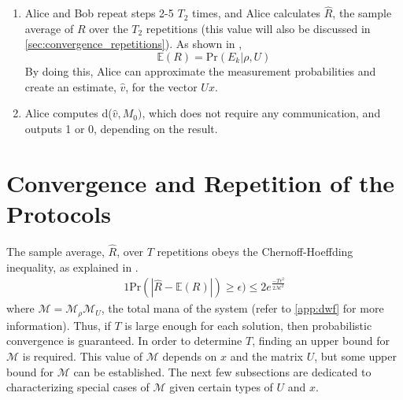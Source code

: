 \documentclass[../3Wworkreport.tex]{subfiles}
\begin{document}
\begin{enumerate}
	\item
		Alice and Bob repeat steps 2-5 $T_2$ times, and Alice calculates $\hat{R}$, the sample average of $R$ over the $T_2$ repetitions (this value will also be discussed in \autoref{sec:convergence_repetitions}). As shown in \cite{Pashayan2014},
		\begin{equation}
			\mathbb{E}(R) = \text{Pr}(E_k| \rho, U)
		\end{equation}
		By doing this, Alice can approximate the measurement probabilities and create an estimate, $\hat{v}$, for the vector $Ux$.

	\item
		Alice computes d($\hat{v}, M_0)$, which does not require any communication, and outputs 1 or 0, depending on the result. 
\end{enumerate}

\section{Convergence and Repetition of the Protocols}
\label{sec:convergence_repetitions}
The sample average, $\hat{R}$, over $T$ repetitions obeys the Chernoff-Hoeffding inequality, as explained in \cite{Pashayan2014}.
\begin{alignat}{1} \label{eq:chernoff}
	\text{Pr}(|\hat{R} - \mathbb{E}(R)|) \ge \epsilon) \le 2e^{\frac{-T\epsilon^2}{2\mathcal{M}^2}}
\end{alignat}
where $\mathcal{M} = \mathcal{M}_\rho\mathcal{M}_U$, the total mana of the system (refer to \autoref{app:dwf} for more information). Thus, if $T$ is large enough for each solution, then probabilistic convergence is guaranteed. In order to determine $T$, finding an upper bound for $\mathcal{M}$ is required. This value of $\mathcal{M}$ depends on $x$ and the matrix $U$, but some upper bound for $\mathcal{M}$ can be established. The next few subsections are dedicated to characterizing special cases of $\mathcal{M}$ given certain types of $U$ and $x$.
\end{document}
